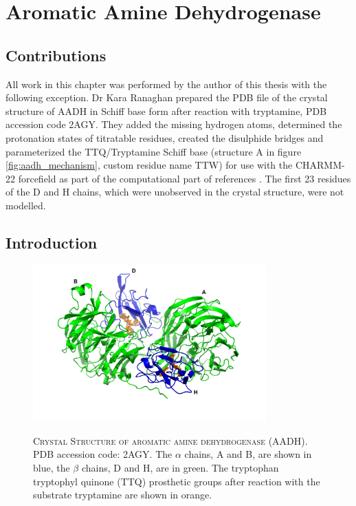 %
%

\chapter{Aromatic Amine Dehydrogenase}
\label{chap:aadh}

\section{Contributions}\label{sec:aadh_contributions}
All work in this chapter was performed by the author of this thesis with the following exception. Dr Kara Ranaghan prepared the PDB file of the crystal structure of AADH in Schiff base form after reaction with tryptamine, PDB accession code 2AGY\cite{masgrauAtomicDescriptionEnzyme2006}. They added the missing hydrogen atoms, determined the protonation states of titratable residues, created the disulphide bridges and parameterized the TTQ/Tryptamine Schiff base (structure A in figure \ref{fig:aadh_mechanism}, custom residue name TTW) for use with the CHARMM-22 forcefield\cite{a.d.mackerellAllAtomEmpiricalPotential1998} as part of the computational part of references \cite{masgrauAtomicDescriptionEnzyme2006, masgrauTunnelingClassicalPaths2007, ranaghanInitioQMMM2017}.  The first 23 residues of the D and H chains, which were unobserved in the crystal structure, were not modelled.

\section{Introduction}
\begin{figure}
    \centering
    \caption[Crystal Structure of aromatic amine dehydrogenase]{\textsc{Crystal Structure of aromatic amine dehydrogenase (AADH)}. PDB accession code: 2AGY\cite{masgrauAtomicDescriptionEnzyme2006}. The $\alpha$ chains, A and B, are shown in blue, the $\beta$ chains, D and H, are in green. The tryptophan tryptophyl quinone (TTQ) prosthetic groups after reaction with the substrate tryptamine are shown in orange.}
    \includegraphics[width=0.8\textwidth]{chapters/aadh/figures/aadh_full_structure.png}
    \label{fig:aadh_full_structure}
\end{figure}

